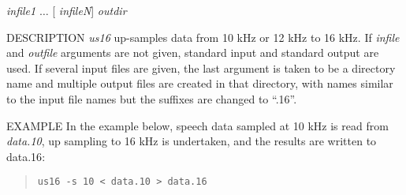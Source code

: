 \begin{synopsis}
\item [us16] [ --s $S$ ] [ {\em infile} ] [ {\em outfile} ]
\item [us16] [ --s $S$ ] {\em infile1} $\dots$ [ {\em infileN}] {\em outdir} 
\end{synopsis}

\begin{qsection}{DESCRIPTION}
{\em us16} up-samples data from 10 kHz or 12 kHz to 16 kHz. 
If {\em infile} and {\em outfile} arguments are not given, 
standard input and standard output are used. 
If several input files are given, 
the last argument is taken to be a directory name 
and multiple output files are created in that directory, 
with names similar to the input file names 
but the suffixes are changed to ``.16''.
\end{qsection}

\begin{options}
\end{options}

\begin{qsection}{EXAMPLE}
In the example below, speech data sampled at 10 kHz
is read from {\em data.10}, up sampling to 16 kHz is undertaken,
and the results are written to {data.16}:
\begin{quote}
\verb!us16 -s 10 < data.10 > data.16!
\end{quote}
\end{qsection}


